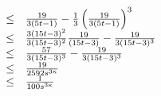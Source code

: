 \begin{equation}
\begin{array}{rcl}
	  & \leq & \frac{19	}
					  {	
					  	3 (5t -1)	
					  } - \frac{1}{3} \lr{
										  	\frac{
													19	}
												  {	
												  	3(5t -1)	
												  }
										  }^3\\
& \leq & \frac{3(15t-3)^2}{3(15t-3)^2}\frac{19}{	 (15t -3)	} -  \frac{19}{	3(15t -3)^3	}\\
& \leq & \frac{57}{	 3(15t -3)^3	} -  \frac{19}{	3(15t -3)^3	}\\
& \leq & \frac{19}{	 2592 s^{3\kappa}	} \\
& \leq &\frac{1}{	 100 s^{3\kappa}	} \\
\end{array}

\end{equation}
